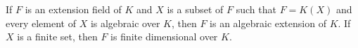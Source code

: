 If $F$ is an extension field of $K$ and $X$ is a subset of $F$ such that $F = K(X)$ and every element of $X$ is algebraic over $K$, then $F$ is an algebraic extension of $K$. If $X$ is a finite set, then $F$ is finite dimensional over $K$.

